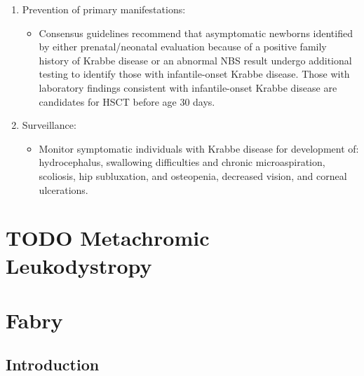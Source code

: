 \documentclass{scrartcl}
\begin{document}
\begin{enumerate}
\begin{enumerate}
\item Prevention of primary manifestations:
\label{sec:orga9d5d88}
\begin{itemize}
\item Consensus guidelines recommend that asymptomatic newborns
identified by either prenatal/neonatal evaluation because of a
positive family history of Krabbe disease or an abnormal NBS
result undergo additional testing to identify those with
infantile-onset Krabbe disease. Those with laboratory findings
consistent with infantile-onset Krabbe disease are candidates for
HSCT before age 30 days.
\end{itemize}

\item Surveillance:
\label{sec:orga56813f}
\begin{itemize}
\item Monitor symptomatic individuals with Krabbe disease for
development of: hydrocephalus, swallowing difficulties and chronic
microaspiration, scoliosis, hip subluxation, and osteopenia,
decreased vision, and corneal ulcerations.
\end{itemize}
\end{enumerate}
\end{enumerate}

\section{{\bfseries\sffamily TODO} Metachromic Leukodystropy}
\label{sec:org8af3516}

\section{Fabry}
\label{sec:orgd4aab07}
\subsection{Introduction}
\label{sec:org2daf20f}
\end{document}
